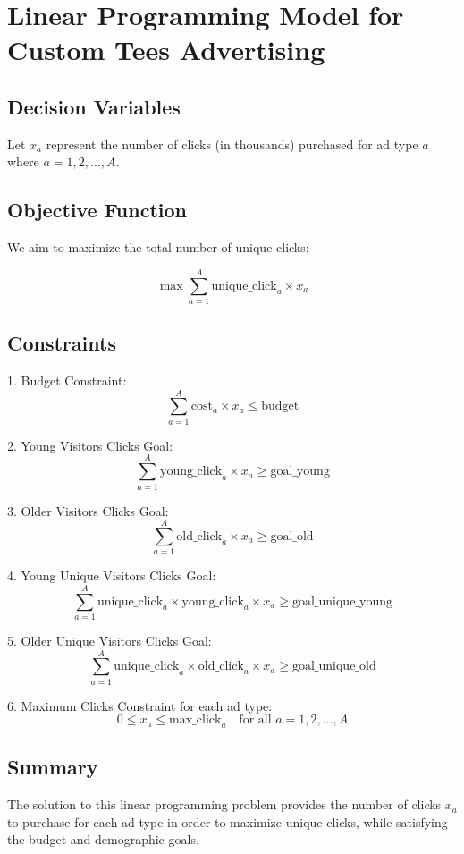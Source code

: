 \documentclass{article}
\begin{document}
\section*{Linear Programming Model for Custom Tees Advertising}

\subsection*{Decision Variables}
Let \( x_a \) represent the number of clicks (in thousands) purchased for ad type \( a \) where \( a = 1, 2, \ldots, A \).

\subsection*{Objective Function}
We aim to maximize the total number of unique clicks:

\[
\max \sum_{a=1}^{A} \text{unique\_click}_{a} \times x_{a}
\]

\subsection*{Constraints}

1. Budget Constraint:
   \[
   \sum_{a=1}^{A} \text{cost}_{a} \times x_{a} \leq \text{budget}
   \]

2. Young Visitors Clicks Goal:
   \[
   \sum_{a=1}^{A} \text{young\_click}_{a} \times x_{a} \geq \text{goal\_young}
   \]

3. Older Visitors Clicks Goal:
   \[
   \sum_{a=1}^{A} \text{old\_click}_{a} \times x_{a} \geq \text{goal\_old}
   \]

4. Young Unique Visitors Clicks Goal:
   \[
   \sum_{a=1}^{A} \text{unique\_click}_{a} \times \text{young\_click}_{a} \times x_{a} \geq \text{goal\_unique\_young}
   \]

5. Older Unique Visitors Clicks Goal:
   \[
   \sum_{a=1}^{A} \text{unique\_click}_{a} \times \text{old\_click}_{a} \times x_{a} \geq \text{goal\_unique\_old}
   \]

6. Maximum Clicks Constraint for each ad type:
   \[
   0 \leq x_{a} \leq \text{max\_click}_{a} \quad \text{for all } a = 1, 2, \ldots, A
   \]

\subsection*{Summary}
The solution to this linear programming problem provides the number of clicks \( x_a \) to purchase for each ad type in order to maximize unique clicks, while satisfying the budget and demographic goals.
\end{document}
